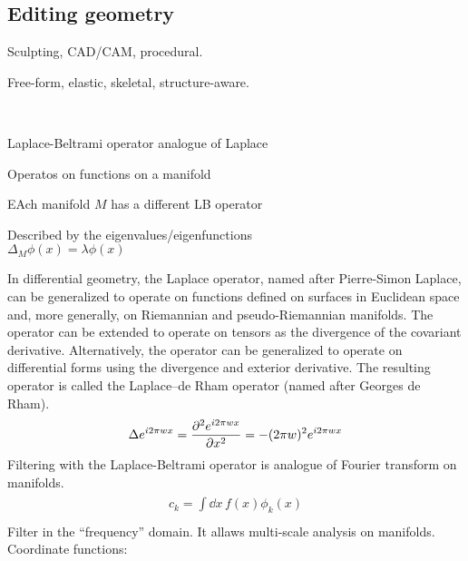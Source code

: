 \begin{compactdesc}
\section{Editing geometry}
	\item[\lp{modeling tools}] Sculpting, CAD/CAM, procedural.
	\item[\lp{Interactive \& sketch-based interfaces}]
	\item[\lp{Deformations}] Free-form, elastic, skeletal, structure-aware.
	\item[\lp{Cutting \& fracturing}]
	\item[\lp{Smoothing \& filtering}]\hfill\\
		\begin{enumerate*}[label=\protect\circled{\arabic*},itemjoin=]
			\item Laplace-Beltrami operator analogue of Laplace\\
			\item Operatos on functions on a manifold\\
			\item EAch manifold $M$ has a different LB operator\\
			\item Described by the eigenvalues/eigenfunctions\\
				$\Delta_M\phi(x)=\lambda\phi(x)$\\
		\end{enumerate*}
		In differential geometry, the Laplace operator, named after Pierre-Simon Laplace, can be generalized to operate on functions defined on surfaces in Euclidean space and, more generally, on Riemannian and pseudo-Riemannian manifolds. The operator can be extended to operate on tensors as the divergence of the covariant derivative. Alternatively, the operator can be generalized to operate on differential forms using the divergence and exterior derivative. The resulting operator is called the Laplace–de Rham operator (named after Georges de Rham).
		\begin{gather*}
			\Delta e^{i2\pi wx}=\frac{\partial^{2} e^{i2\pi wx}}{\partial x ^{2}}=-(2\pi w)^2e^{i2\pi wx}
		\end{gather*}
		Filtering with the Laplace-Beltrami operator is analogue of Fourier transform on manifolds.
		\begin{gather*}
			c_k={\scriptstyle\int\limits_{}^{}}\dd{x}\, f(x)\phi_k(x)
		\end{gather*}
		Filter in the ``frequency'' domain. It allaws multi-scale analysis on manifolds. Coordinate functions:
		\begin{align*}

\end{align*}
\end{compactdesc}
